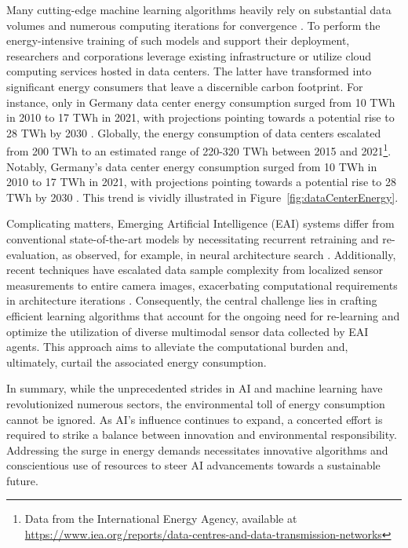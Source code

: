 \documentclass[12pt]{article}
\begin{document}
Many cutting-edge machine learning algorithms heavily rely on substantial data volumes and numerous computing iterations for convergence \cite{Strubell2019EnergyPolicyConsiderations}. To perform the energy-intensive training of such models and support their deployment, researchers and corporations leverage existing infrastructure or utilize cloud computing services hosted in data centers. The latter have transformed into significant energy consumers that leave a discernible carbon footprint. For instance, only in Germany data center energy consumption surged from 10 TWh in 2010 to 17 TWh in 2021, with projections pointing towards a potential rise to 28 TWh by 2030 \cite{Hintemann2022Cloudcomputingdrives}. Globally, the energy consumption of data centers escalated from 200 TWh to an estimated range of 220-320 TWh between 2015 and 2021\footnote{Data from the International Energy Agency, available at \url{https://www.iea.org/reports/data-centres-and-data-transmission-networks}}. Notably, Germany's data center energy consumption surged from 10 TWh in 2010 to 17 TWh in 2021, with projections pointing towards a potential rise to 28 TWh by 2030 \cite{Hintemann2022Cloudcomputingdrives}. This trend is vividly illustrated in Figure~\ref{fig:dataCenterEnergy}.

Complicating matters, Emerging Artificial Intelligence (EAI) systems differ from conventional state-of-the-art models by necessitating recurrent retraining and re-evaluation, as observed, for example, in neural architecture search \cite{real2019regularized}. Additionally, recent techniques have escalated data sample complexity from localized sensor measurements to entire camera images, exacerbating computational requirements in architecture iterations \cite{krizhevsky2012imagenet}. Consequently, the central challenge lies in crafting efficient learning algorithms that account for the ongoing need for re-learning and optimize the utilization of diverse multimodal sensor data collected by EAI agents. This approach aims to alleviate the computational burden and, ultimately, curtail the associated energy consumption.

In summary, while the unprecedented strides in AI and machine learning have revolutionized numerous sectors, the environmental toll of energy consumption cannot be ignored. As AI's influence continues to expand, a concerted effort is required to strike a balance between innovation and environmental responsibility. Addressing the surge in energy demands necessitates innovative algorithms and conscientious use of resources to steer AI advancements towards a sustainable future.
\end{document}
